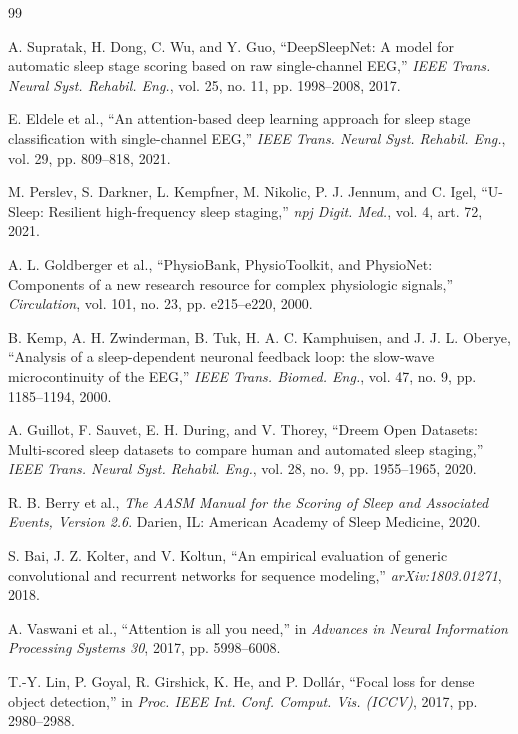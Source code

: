 \documentclass[conference]{IEEEtran}
\begin{document}
\begin{thebibliography}{99}

 A. Supratak, H. Dong, C. Wu, and Y. Guo, ``DeepSleepNet: A model for
automatic sleep stage scoring based on raw single-channel EEG,'' \emph{IEEE Trans. Neural Syst.
Rehabil. Eng.}, vol. 25, no. 11, pp. 1998--2008, 2017.

 E. Eldele et al., ``An attention-based deep learning approach for sleep stage
classification with single-channel EEG,'' \emph{IEEE Trans. Neural Syst. Rehabil. Eng.}, vol. 29,
pp. 809--818, 2021.

 M. Perslev, S. Darkner, L. Kempfner, M. Nikolic, P. J. Jennum, and C. Igel,
``U-Sleep: Resilient high-frequency sleep staging,'' \emph{npj Digit. Med.}, vol. 4, art. 72, 2021.

 A. L. Goldberger et al., ``PhysioBank, PhysioToolkit, and PhysioNet: Components
of a new research resource for complex physiologic signals,'' \emph{Circulation}, vol. 101, no. 23,
pp. e215--e220, 2000.

 B. Kemp, A. H. Zwinderman, B. Tuk, H. A. C. Kamphuisen, and J. J. L. Oberye,
``Analysis of a sleep-dependent neuronal feedback loop: the slow-wave microcontinuity of the EEG,''
\emph{IEEE Trans. Biomed. Eng.}, vol. 47, no. 9, pp. 1185--1194, 2000.

 A. Guillot, F. Sauvet, E. H. During, and V. Thorey, ``Dreem Open Datasets:
Multi-scored sleep datasets to compare human and automated sleep staging,'' \emph{IEEE Trans.
Neural Syst. Rehabil. Eng.}, vol. 28, no. 9, pp. 1955--1965, 2020.

 R. B. Berry et al., \emph{The AASM Manual for the Scoring of Sleep and Associated
Events, Version 2.6}. Darien, IL: American Academy of Sleep Medicine, 2020.

 S. Bai, J. Z. Kolter, and V. Koltun, ``An empirical evaluation of generic
convolutional and recurrent networks for sequence modeling,'' \emph{arXiv:1803.01271}, 2018.

 A. Vaswani et al., ``Attention is all you need,'' in \emph{Advances in Neural
Information Processing Systems 30}, 2017, pp. 5998--6008.

 T.-Y. Lin, P. Goyal, R. Girshick, K. He, and P. Doll\'ar, ``Focal loss for dense
object detection,'' in \emph{Proc. IEEE Int. Conf. Comput. Vis. (ICCV)}, 2017, pp. 2980--2988.


\end{thebibliography}
\end{document}
